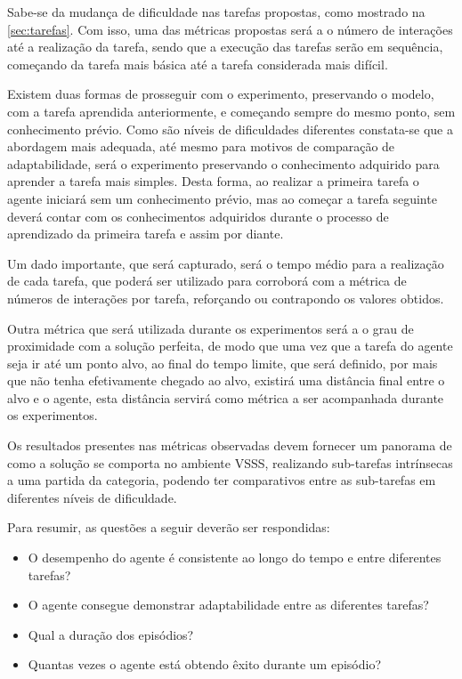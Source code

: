 Sabe-se da mudança de dificuldade nas tarefas propostas, como mostrado na \ref{sec:tarefas}. Com isso, uma das métricas propostas será a o número de interações até a realização da tarefa, sendo que a execução das tarefas serão em sequência, começando da tarefa mais básica até a tarefa considerada mais difícil.

Existem duas formas de prosseguir com o experimento, preservando o modelo, com a tarefa aprendida anteriormente, e começando sempre do mesmo ponto, sem conhecimento prévio. Como são níveis de dificuldades diferentes constata-se que a abordagem mais adequada, até mesmo para motivos de comparação de adaptabilidade, será o experimento preservando o conhecimento adquirido para aprender a tarefa mais simples. Desta forma, ao realizar a primeira tarefa o agente iniciará sem um conhecimento prévio, mas ao começar a tarefa seguinte deverá contar com os conhecimentos adquiridos durante o processo de aprendizado da primeira tarefa e assim por diante.

Um dado importante, que será capturado, será o tempo médio para a realização de cada tarefa, que poderá ser utilizado para corroborá com a métrica de números de interações por tarefa, reforçando ou contrapondo os valores obtidos.

Outra métrica que será utilizada durante os experimentos será a o grau de proximidade com a solução perfeita, de modo que uma vez que a tarefa do agente seja ir até um ponto alvo, ao final do tempo limite, que será definido, por mais que não tenha efetivamente chegado ao alvo, existirá uma distância final entre o alvo e o agente, esta distância servirá como métrica a ser acompanhada durante os experimentos.


Os resultados presentes nas métricas observadas devem fornecer um panorama de como a solução se comporta no ambiente VSSS, realizando sub-tarefas intrínsecas a uma partida da categoria, podendo ter comparativos entre as sub-tarefas em diferentes níveis de dificuldade.

Para resumir, as questões a seguir deverão ser respondidas:

\begin{itemize}
    \item O desempenho do agente é consistente ao longo do tempo e entre diferentes tarefas?
    
    \item O agente consegue demonstrar adaptabilidade entre as diferentes tarefas?
    
    \item Qual a duração dos episódios?
    
    \item Quantas vezes o agente está obtendo êxito durante um episódio?
\end{itemize}


